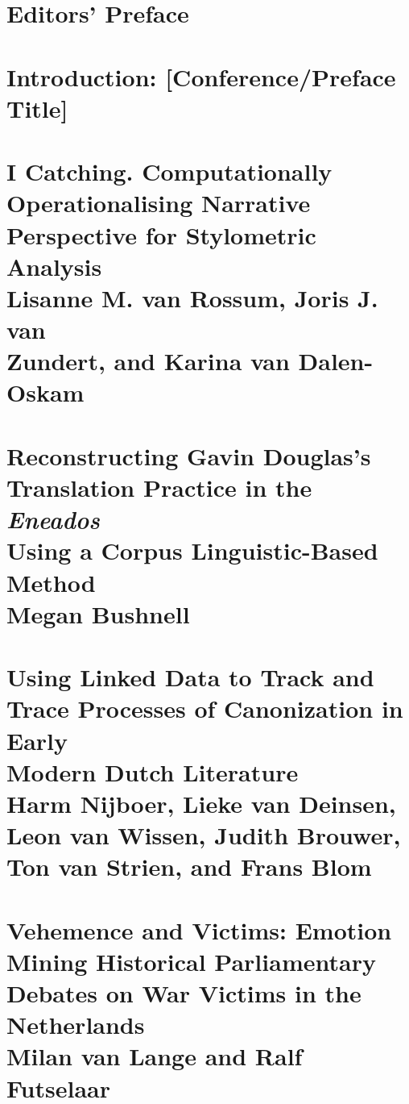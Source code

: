 \documentclass{book}
\newcommand\MyCmd[1]{\mbox{}\clearpage\setcounter{page}{#1}}
\begin{document}
 \tableofcontents
 \thispagestyle{empty}

\renewcommand{\partname}{}
\renewcommand{\thepart}{}
\renewcommand{\thesection}{}


\MyCmd{1}
\section{Editors' Preface}
\MyCmd{3}
\section{Introduction: [Conference/Preface Title]}
\MyCmd{3}

\MyCmd{1}
\section{\textbf{I Catching. Computationally \\ Operationalising Narrative Perspective for Stylometric Analysis} \\ 
Lisanne M. van Rossum, Joris J. van \\ Zundert, and Karina van Dalen-Oskam}
\MyCmd{13}
\section{\textbf{Reconstructing Gavin Douglas’s \\ Translation Practice in the \textit{Eneados} \\ Using a Corpus Linguistic-Based Method} \\ Megan Bushnell}
\MyCmd{39}
\section{\textbf{Using Linked Data to Track and Trace Processes of Canonization in Early \\ Modern Dutch Literature} \\ 
Harm Nijboer, Lieke van Deinsen, Leon van Wissen, Judith Brouwer, Ton van Strien, and Frans Blom}
\MyCmd{61}
\section{\textbf{Vehemence and Victims: Emotion \\ Mining Historical Parliamentary \\ Debates on War Victims in the \\ Netherlands} \\ 
Milan van Lange and Ralf Futselaar}
\MyCmd{81}
\end{document}
